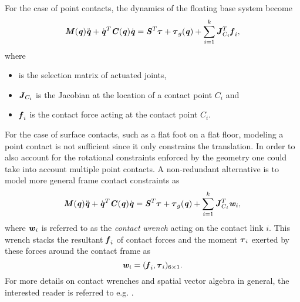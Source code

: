 For the case of point contacts, the dynamics of the floating base system become
\begin{equation*} \label{eqn:EoMLeggedRobotPtContact}
\bm{\mathit{M}}(\bm{\mathit{q}})\ddot{\bm{\mathit{q}}}+\dot{\bm{\mathit{q}}}^T\bm{\mathit{C}}(\bm{\mathit{q}})\dot{\bm{\mathit{q}}}=\bm{\mathit{S}}^T\bm{\mathit{\tau}}+\bm{\mathit{\tau}}_g(\bm{\mathit{q}})+\sum_{i=1}^{k}\bm{\mathit{J}}_{C_i}^T\bm{\mathit{f}}_i,
\end{equation*}
where 
\begin{itemize}
\item {} is the selection matrix of actuated joints,
\item $\bm{\mathit{J}}_{C_i}$ is the Jacobian at the location of a contact point $C_i$ and
\item $\bm{\mathit{f}}_i$ is the contact force acting at the contact point $C_i$.
\end{itemize}
For the case of surface contacts, such as a flat foot on a flat floor, modeling a point contact is not sufficient since it only constrains the translation. In order to also account for the rotational constraints enforced by the geometry one could take into account multiple point contacts. A non-redundant alternative is to model more general frame contact constraints as
\begin{equation*} \label{eqn:EoMLeggedRobotSurfaceContact}
\bm{\mathit{M}}(\bm{\mathit{q}})\ddot{\bm{\mathit{q}}}+\dot{\bm{\mathit{q}}}^T\bm{\mathit{C}}(\bm{\mathit{q}})\dot{\bm{\mathit{q}}}=\bm{\mathit{S}}^T\bm{\mathit{\tau}}+\bm{\mathit{\tau}}_g(\bm{\mathit{q}})+\sum_{i=1}^{k}\bm{\mathit{J}}_{C_i}^T\bm{\mathit{w}}_i,
\end{equation*}
where $\bm{\mathit{w}}_i$ is referred to as the \textit{contact wrench} acting on the contact link $i$. This wrench stacks the resultant $\bm{\mathit{f}}_i$ of contact forces and the moment $\bm{\mathit{\tau}}_i$ exerted by these forces around the contact frame as
$$\bm{\mathit{w}}_i=(\bm{\mathit{f}}_i,\bm{\mathit{\tau}}_i)_{6\times 1}.$$ 
For more details on contact wrenches and spatial vector algebra in general, the interested reader is referred to e.g. \cite[Ch.2]{featherstone2014rigid}.


